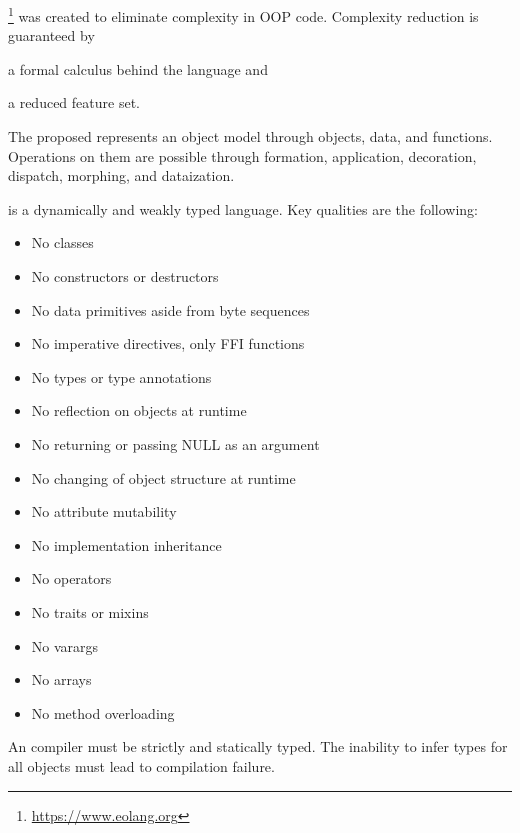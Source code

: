 
\eolang{}\footnote{\url{https://www.eolang.org}} was created to eliminate complexity in OOP code.
Complexity reduction is guaranteed by
\begin{inparaenum}[1)]
  \item a formal calculus behind the language
  and
  \item a reduced feature set.
\end{inparaenum}
The proposed \phic{} represents an object model through objects, data, and functions.
Operations on them are possible through formation, application, decoration, dispatch, morphing, and dataization.

\eolang{} is a dynamically and weakly typed language.
Key qualities are the following:

\begin{itemize}
  \item No classes
  \item No constructors or destructors
  \item No data primitives aside from byte sequences
  \item No imperative directives, only FFI functions
  \item No types or type annotations
  \item No reflection on objects at runtime
  \item No returning or passing NULL as an argument
  \item No changing of object structure at runtime
  \item No attribute mutability
  \item No implementation inheritance
  \item No operators
  \item No traits or mixins
  \item No varargs
  \item No arrays
  \item No method overloading
\end{itemize}

An \eolang{} compiler must be strictly and statically typed.
The inability to infer types for all objects must lead to compilation failure.
